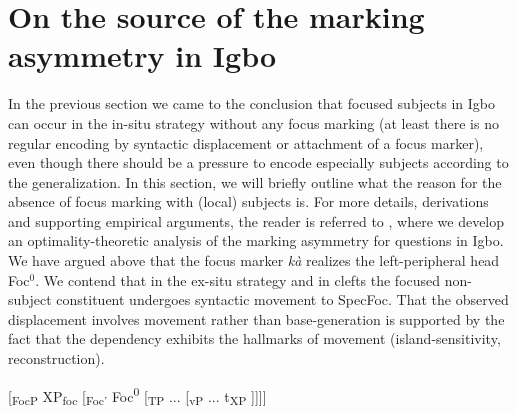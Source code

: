 \documentclass[output=paper,colorlinks,citecolor=brown]{langscibook}
\begin{document}
\section{On the source of the marking asymmetry in Igbo}\label{sec:amaechi:5}

In the previous section we came to the conclusion that focused subjects in Igbo can occur in the in-situ strategy without any focus marking  (at least there is no regular encoding by syntactic displacement or attachment of a focus marker), even though there should be a pressure to encode especially subjects according to the \citeauthor{FiedlerEtAl2010} generalization. In this section, we will briefly outline what the reason for the absence of focus marking with (local) subjects is. For more details, derivations and supporting empirical arguments, the reader is referred to \citet{AmaechiGeorgi2019}, where we develop an optimality-theoretic analysis of the marking asymmetry for questions in Igbo. We have argued above that the focus marker \textit{k\`a} realizes the left-peripheral head Foc$^{0}$. We contend that in the ex-situ strategy and in clefts the focused non-subject constituent undergoes syntactic movement to SpecFoc. That the observed displacement involves movement rather than base-generation is supported by the fact that the dependency exhibits the hallmarks of movement (island-sensitivity, reconstruction).

\ea%
    \label{ex:amaechi:15}
    [\textsubscript{{FocP}} XP\textsubscript{{foc}} [\textsubscript{{Foc'}} Foc\textsuperscript{0} [\textsubscript{{TP}} ... [\textsubscript{{vP}} ... t\textsubscript{{XP}} ]]]]
\z
\end{document}
